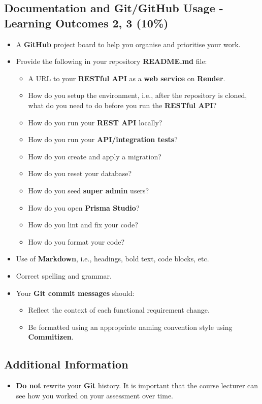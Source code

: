 \documentclass{article}
\begin{document}
\subsection*{Documentation and Git/GitHub Usage - Learning Outcomes 2, 3 (10\%)}
\begin{itemize}
	\item A \textbf{GitHub} project board to help you organise and prioritise your work. 
	\item Provide the following in your repository \textbf{README.md} file:
	\begin{itemize}
		\item A URL to your \textbf{RESTful API} as a \textbf{web service} on \textbf{Render}.
		\item How do you setup the environment, i.e., after the repository is cloned, what do you need to do before you run the \textbf{RESTful API}?
		\item How do you run your \textbf{REST API} locally?
		\item How do you run your \textbf{API/integration tests}?
		\item How do you create and apply a migration?  
		\item How do you reset your database?
		\item How do you seed \textbf{super admin} users?
		\item How do you open \textbf{Prisma Studio}?
		\item How do you lint and fix your code?
		\item How do you format your code?
	\end{itemize}
	\item Use of \textbf{Markdown}, i.e., headings, bold text, code blocks, etc.
	\item Correct spelling and grammar. 
	\item Your \textbf{Git commit messages} should:
	\begin{itemize}
		\item Reflect the context of each functional requirement change.
		\item Be formatted using an appropriate naming convention style using \textbf{Commitizen}.
	\end{itemize}	
\end{itemize}

\subsection*{Additional Information}
\begin{itemize}
	\item \textbf{Do not} rewrite your \textbf{Git} history. It is important that the course lecturer can see how you worked on your assessment over time.
\end{itemize}
\end{document}
